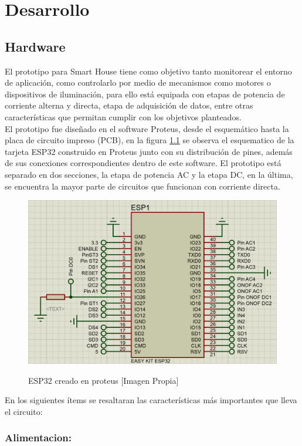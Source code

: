 \chapter{Desarrollo}

\section{Hardware}\label{sec:hw}

El prototipo para Smart House tiene como objetivo tanto monitorear el entorno de aplicación, como controlarlo por medio de mecanismos como motores o dispositivos de iluminación, para ello está equipada con etapas de potencia de corriente alterna y directa, etapa de adquisición de datos, entre otras características que permitan cumplir con los objetivos planteados.\\ 

El prototipo fue diseñado en el software Proteus, desde el esquemático hasta la placa de circuito impreso (PCB), en la figura \ref{fig:esp32} se observa el esquematico de la tarjeta ESP32 construido en Proteus junto con su distribución de pines, además de sus conexiones correspondientes dentro de este software. El prototipo está separado en dos secciones, la etapa de potencia AC y la etapa DC, en la última, se encuentra la mayor parte de circuitos que funcionan con corriente directa.\\

\begin{figure}[H]
	\centering
	\caption{ESP32 creado en proteus [Imagen Propia]}
	\includegraphics[width=0.5\linewidth]{Imagenes/ESP32}	
	\label{fig:esp32}
\end{figure}

En los siguientes ítems se resaltaran las características más importantes que lleva el circuito:\\

	\subsection{Alimentacion:}
	
